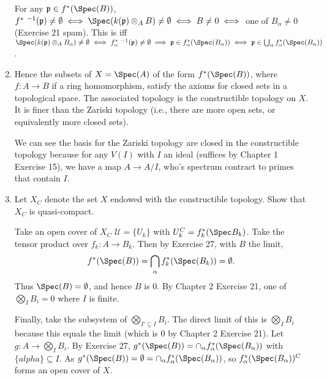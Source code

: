 \documentclass[a4paper]{exam}
\begin{document}
\begin{questions}
\begin{enumerate}
\begin{solution}
	For any $\mathfrak{p} \in f^\ast(\Spec(B)) $, $f^\ast\ ^{-1}(\mathfrak{p}) \ne \emptyset \iff \Spec(k(\mathfrak{p}) \otimes _A B) \ne \emptyset \iff B \ne 0 \iff $ one of $B_ \alpha \ne 0$ (Exercise 21 spam).
	This is iff $\Spec(k(\mathfrak{p}) \otimes _A B_ \alpha) \ne \emptyset \iff f_ \alpha^\ast\ ^{-1}(\mathfrak{p}) \ne \emptyset \implies \mathfrak{p} \in f_ \alpha^\ast(\Spec(B_ \alpha)) \iff \mathfrak{p} \in \bigcup_{\alpha} f_ \alpha^\ast(\Spec(B_ \alpha))$.
\end{solution}
\item Hence the subsets of $X = \Spec(A) $ of the form $f^\ast(\Spec(B)) $, where $f:A\to B $ if a ring homomorphism, satisfy the axioms for closed sets in a topological space. The associated topology is the constructible topology on $X $. It is finer than the Zariski topology (i.e., there are more open sets, or equivalently more closed sets).
\begin{solution}
	We can see the basis for the Zariski topology are closed in the constructible topology because for any $V(I) $ with $I $ an ideal (suffices by Chapter 1 Exercise 15), we have a map $A \to A / I $, who's spectrum contract to primes that contain $I $.
\end{solution}
\item Let $X_C $ denote the set $X $ endowed with the constructible topology. Show that $X_C $ is quasi-compact.
\begin{solution}
	Take an open cover of $X_C $ $\mathcal{U} = \{U_k\}$ with $U_k^C = f_k^\ast(\Spec B_k) $.
	Take the tensor product over $f_k: A\to B_k $.
	Then by Exercise 27, with $B$ the limit,
	\[
		f^\ast(\Spec(B)) = \bigcap_{\alpha} f^\ast_{k}(\Spec(B_k)) = \emptyset
	.\] 
	Thus $\Spec(B) = \emptyset$, and hence $B $ is 0.
	By Chapter 2 Exercise 21, one of $\bigotimes_I B_i = 0 $ where $I $ is finite.

	Finally, take the subsystem of $\bigotimes_{I' \subseteq I}B_i $.
	The direct limit of this is $\bigotimes_I B_i $ because this equals the limit (which is 0 by Chapter 2 Exercise 21).
	Let $g: A\to \bigotimes_I B_i $.
	By Exercise 27, $g^\ast (\Spec(B)) = \cap_{\alpha} f^\ast_ \alpha(\Spec(B_ \alpha))$ with $\{alpha\}\subseteq I $.
	As $g^\ast(\Spec(B)) = \emptyset = \cap_{\alpha} f^\ast_ \alpha(\Spec(B_ \alpha))$, so $f_ \alpha^\ast(\Spec(B_{ \alpha}))^C $ forms an open cover of $X $.
\end{solution}
\end{enumerate}


\end{questions}
\end{document}
